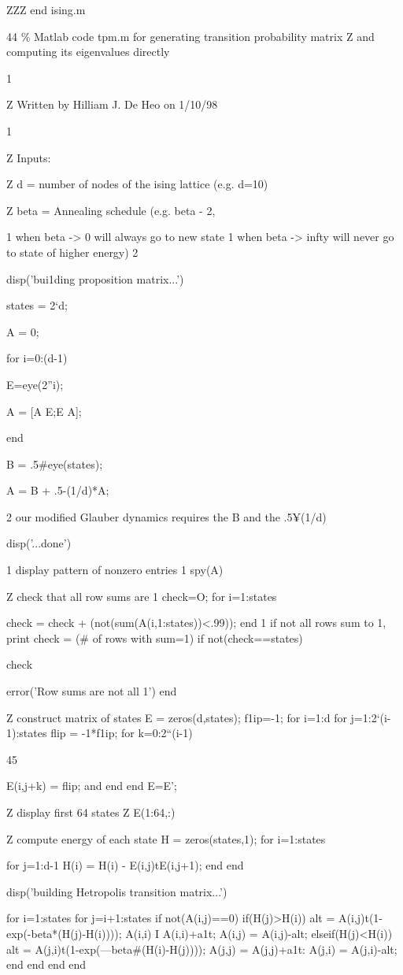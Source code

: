 ZZZ end ising.m

44
\% Matlab code tpm.m for generating transition probability matrix
Z and computing its eigenvalues directly

1

Z Written by Hilliam J. De Heo on 1/10/98

1

Z Inputs:

Z d = number of nodes of the ising lattice (e.g. d=10)

Z beta = Annealing schedule (e.g. beta - 2,

1 when beta -> 0 will always go to new state
1 when beta -> infty will never go to state of higher energy)
2

disp(’bui1ding proposition matrix...’)

states = 2‘d;

A = 0;

for i=0:(d-1)

E=eye(2”i);

A = [A E;E A];

end

B = .5#eye(states);

A = B + .5-(1/d)*A;

2 our modified Glauber dynamics requires the B and the .5¥(1/d)

disp(’...done’)

1 display pattern of nonzero entries
1 spy(A)

Z check that all row sums are 1
check=O;
for i=1:states

check = check + (not(sum(A(i,1:states))<.99));
end
1 if not all rows sum to 1, print check = (# of rows with sum=1)
if not(check==states)

check

error(’Row sums are not all 1’)
end

Z construct matrix of states
E = zeros(d,states);
f1ip=-1;
for i=1:d
for j=1:2‘(i-1):states
flip = -1*f1ip;
for k=0:2“(i-1)

45

E(i,j+k) = flip;
and
end
end
E=E’;

Z display first 64 states
Z E(1:64,:)

Z compute energy of each state
H = zeros(states,1);
for i=1:states

for j=1:d-1
H(i) = H(i) - E(i,j)tE(i,j+1);
end
end

disp(’building Hetropolis transition matrix...')

for i=1:states
for j=i+1:states
if not(A(i,j)==0)
if(H(j)>H(i))
alt = A(i,j)t(1-exp(-beta*(H(j)-H(i))));
A(i,i) I A(i,i)+a1t;
A(i,j) = A(i,j)-alt;
elseif(H(j)<H(i))
alt = A(j,i)t(1-exp(—beta#(H(i)-H(j))));
A(j,j) = A(j,j)+a1t:
A(j,i) = A(j,i)-alt;
end
end
end
end

